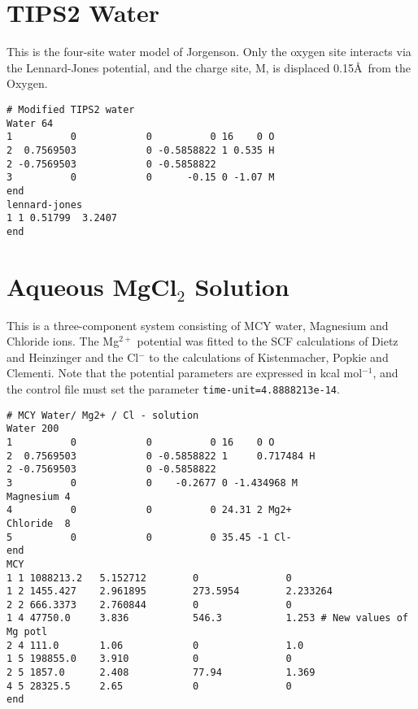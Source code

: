 \documentclass[twoside]{report}
\begin{document}
\section{TIPS2 Water}%
This is the four-site water model of Jorgenson\cite{jorgensen:82}.  
Only the oxygen site interacts via the Lennard-Jones
potential, and the charge site, M, is displaced 0.15\AA\ from the Oxygen.
\begin{verbatim}
# Modified TIPS2 water
Water 64
1          0            0          0 16    0 O
2  0.7569503            0 -0.5858822 1 0.535 H
2 -0.7569503            0 -0.5858822
3          0            0      -0.15 0 -1.07 M
end
lennard-jones
1 1 0.51799  3.2407
end
\end{verbatim}
\section{Aqueous MgCl$_2$ Solution}%
This is a three-component system consisting of MCY
water\cite{matsuoka:75}, Magnesium and Chloride ions.  The Mg$^{2+}$
potential was fitted to the SCF calculations of Dietz and
Heinzinger\cite{dietz:82} and the Cl$^-$ to the calculations of
Kistenmacher, Popkie and Clementi\cite{kistenmacher:73b}.  Note that
the potential parameters are expressed in kcal mol$^{-1}$, and the
control file must set the parameter \texttt{time-unit=4.8888213e-14}.
\begin{verbatim}
# MCY Water/ Mg2+ / Cl - solution
Water 200
1          0            0          0 16    0 O
2  0.7569503            0 -0.5858822 1     0.717484 H
2 -0.7569503            0 -0.5858822
3          0            0    -0.2677 0 -1.434968 M
Magnesium 4
4          0            0          0 24.31 2 Mg2+
Chloride  8
5          0            0          0 35.45 -1 Cl-
end
MCY
1 1 1088213.2   5.152712        0               0
1 2 1455.427    2.961895        273.5954        2.233264
2 2 666.3373    2.760844        0               0
1 4 47750.0     3.836           546.3           1.253 # New values of Mg potl
2 4 111.0       1.06            0               1.0   
1 5 198855.0    3.910           0               0
2 5 1857.0      2.408           77.94           1.369
4 5 28325.5     2.65            0               0
end
\end{verbatim}
\end{document}
